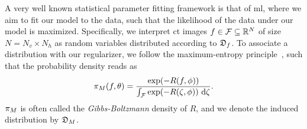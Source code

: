 \documentclass[../ml-ct.tex]{subfiles}
\begin{document}
A very well known statistical parameter fitting framework is that of \gls{ml}, where we aim to fit our model to the data, such that the likelihood of the data under our model is maximized.
Specifically, we interpret \gls{ct} images \( f \in \mathcal{F} \subseteq \mathbb{R}^N \) of size \( N = N_v \times N_h \) as random variables distributed according to \( \mathfrak{D}_{f} \).
To associate a distribution with our regularizer, we follow the maximum-entropy principle~\cite{zhu_filters_1998}, such that the probability density reads as
\begin{equation}
	\pdf{M}(f, \theta) = \frac{\exp(-R(f, \params))}{\int_{\set{F}} \exp(-R(\zeta, \params))\ \dd \zeta}.%
	\label{eq:learning:model density}
\end{equation}
\( \pi_{M} \) is often called the \emph{Gibbs-Boltzmann} density of \( R \), and we denote the induced distribution by \( \mathfrak{D}_{M} \).
\end{document}
